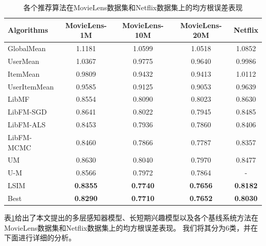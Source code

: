 \begin{table}[htbp]
    \centering
    \caption{各个推荐算法在MovieLens数据集和Netflix数据集上的均方根误差表现}
    \label{tab:msre}
    \begin{tabular}{|l|c|c|c|c|}
        \hline
        \textbf{Algorithms} & \textbf{MovieLens-1M} & \textbf{MovieLens-10M} & \textbf{MovieLens-20M} & \textbf{Netflix} \\
        \hline
        GlobalMean   & 1.1181          & 1.0599          & 1.0518          & 1.0852          \\
        UserMean     & 1.0367          & 0.9775          & 0.9640          & 0.9986          \\
        ItemMean     & 0.9809          & 0.9432          & 0.9413          & 1.0112          \\
        UserItemMean & 0.9585          & 0.9125          & 0.9053          & 0.9639          \\
        \hline
        LibMF        & 0.8554          & 0.8090          & 0.8023          & 0.8630          \\
        \hline
        LibFM-SGD    & 0.8641          & 0.8022          & 0.7945          & 0.8485          \\
        LibFM-ALS    & 0.8453          & 0.7936          & 0.7860          & 0.8406          \\
        LibFM-MCMC   & 0.8460          & 0.7866          & 0.7787          & 0.8357          \\
        \hline
        UM           & 0.8630          & 0.8040          & 0.7970          & 0.8477          \\
        U-M          & 0.8566          & 0.7972          & 0.7864          & -               \\
        \hline
        LSIM         & \textbf{0.8355} & \textbf{0.7740} & \textbf{0.7656} & \textbf{0.8182} \\
        \hline
        Best         & \textbf{0.8290} & \textbf{0.7710} & \textbf{0.7652} & \textbf{0.8030} \\
        \hline
    \end{tabular}
\end{table}

表\ref{tab:msre}给出了本文提出的多层感知器模型、长短期兴趣模型以及各个基线系统方法在MovieLens数据集和Netflix数据集上的均方根误差表现。
我们将其分为$6$类，并在下面进行详细的分析。


